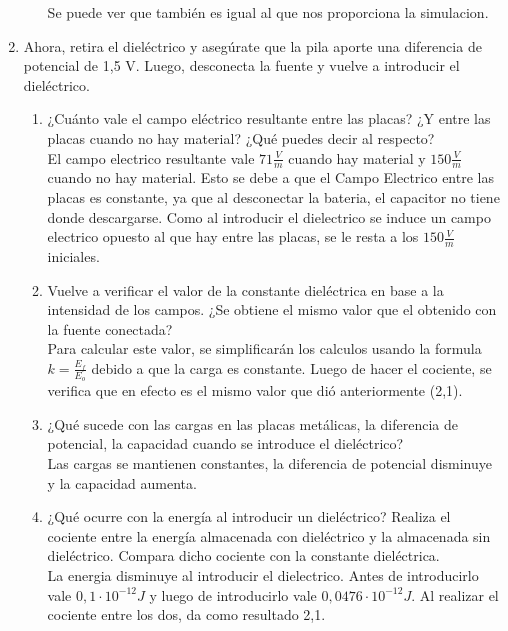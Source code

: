 \documentclass[12pt]{report}
\begin{document}
\begin{enumerate}
\begin{enumerate}
        Se puede ver que también es igual al que nos proporciona la simulacion.

    \end{enumerate}
    \item Ahora, retira el dieléctrico y asegúrate que la pila aporte una diferencia de potencial de 1,5 V. Luego, desconecta la fuente y vuelve a introducir el dieléctrico.
    \begin{enumerate}
        \item ¿Cuánto vale el campo eléctrico resultante entre las placas? ¿Y entre las placas cuando no hay material? ¿Qué puedes decir al respecto?\\[6pt]
        El campo electrico resultante vale $71 \frac{V}{m}$ cuando hay material y $150 \frac{V}{m}$ cuando no hay material. Esto se debe a que el Campo Electrico entre las placas es constante, ya que al desconectar la bateria, el capacitor no tiene donde descargarse. Como al introducir el dielectrico se induce un campo electrico opuesto al que hay entre las placas, se le resta a los $150 \frac{V}{m}$ iniciales.\\

        \item Vuelve a verificar el valor de la constante dieléctrica en base a la intensidad de los campos. ¿Se obtiene el mismo valor que el obtenido con la fuente conectada?\\[6pt]
        Para calcular este valor, se simplificarán los calculos usando la formula $k = \frac{E_f}{E_o}$ debido a que la carga es constante. Luego de hacer el cociente, se verifica que en efecto es el mismo valor que dió anteriormente (2,1).\\

        \item ¿Qué sucede con las cargas en las placas metálicas, la diferencia de potencial, la capacidad cuando se introduce el dieléctrico?\\[6pt]
        Las cargas se mantienen constantes, la diferencia de potencial disminuye y la capacidad aumenta.\\

        \item ¿Qué ocurre con la energía al introducir un dieléctrico? Realiza el cociente entre la energía almacenada con dieléctrico y la almacenada sin dieléctrico. Compara dicho cociente con la constante dieléctrica.\\[6pt]
        La energia disminuye al introducir el dielectrico. Antes de introducirlo vale $0,1 \cdot 10^{-12} J$ y luego de introducirlo vale $0,0476 \cdot 10^{-12} J$. Al realizar el cociente entre los dos, da como resultado 2,1.\\


    \end{enumerate}
\end{enumerate}
\end{document}
